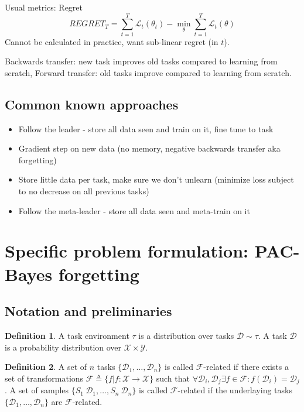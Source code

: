 \documentclass[letterpaper]{article}
\theoremstyle{definition}
\newtheorem{defn}{Definition}[section]
\begin{document}
Usual metrics:
Regret $$REGRET_T = \sum_{t=1}^{T}\mathcal{L}_t(\theta_t)-\min_\theta \sum_{t=1}^{T}\mathcal{L}_t(\theta)$$
Cannot be calculated in practice, want sub-linear regret (in $t$).

Backwards transfer: new task improves old tasks compared to learning from scratch, Forward transfer: old tasks improve compared to learning from scratch.

\subsection{Common known approaches}
\begin{itemize}
	\item Follow the leader - store all data seen and train on it, fine tune to task
	\item Gradient step on new data (no memory, negative backwards transfer aka forgetting)
	\item Store little data per task, make sure we don't unlearn (minimize loss subject to no decrease on all previous tasks)
	\item Follow the meta-leader - store all data seen and meta-train on it
\end{itemize}

\section{Specific problem formulation: PAC-Bayes forgetting}
	
\subsection{Notation and preliminaries}

\begin{defn}
	A task environment $\tau$ is a distribution over tasks $\mathcal{D}\sim \tau$. A task $\mathcal{D}$ is a probability distribution over $\mathcal{X}\times \mathcal{Y}$.
\end{defn}

\begin{defn}
	A set of $n$ tasks $\{\mathcal{D}_1,\ldots,\mathcal{D}_n\}$ is called $\mathcal{F}$-related if there exists a set of transformations $\mathcal{F}\triangleq\{f|f:\mathcal{X}\rightarrow\mathcal{X}\}$ such that $\forall\mathcal{D}_i,\mathcal{D}_j \exists f\in\mathcal{F}: f(\mathcal{D}_i)=\mathcal{D}_j$.
	A set of samples $\{S_1~\mathcal{D}_1,\ldots,S_n~\mathcal{D}_n\}$ is called $\mathcal{F}$-related if the underlaying tasks $\{\mathcal{D}_1,\ldots,\mathcal{D}_n\}$ are $\mathcal{F}$-related.
\end{defn}
\end{document}
